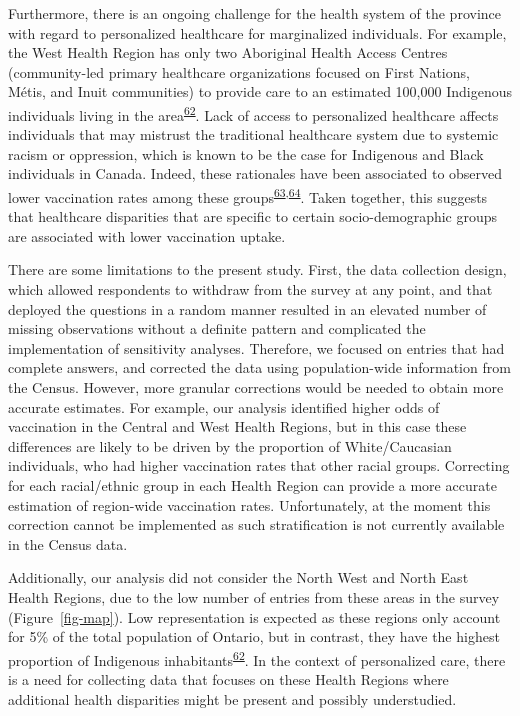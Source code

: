 \documentclass[
  letterpaper,
  DIV=11,
  numbers=noendperiod]{scrartcl}
\begin{document}
Furthermore, there is an ongoing challenge for the health system of the
province with regard to personalized healthcare for marginalized
individuals. For example, the West Health Region has only two Aboriginal
Health Access Centres (community-led primary healthcare organizations
focused on First Nations, Métis, and Inuit communities) to provide care
to an estimated 100,000 Indigenous individuals living in the
area\textsuperscript{\protect\hyperlink{ref-ontariohealth}{62}}. Lack of
access to personalized healthcare affects individuals that may mistrust
the traditional healthcare system due to systemic racism or oppression,
which is known to be the case for Indigenous and Black individuals in
Canada. Indeed, these rationales have been associated to observed lower
vaccination rates among these
groups\textsuperscript{\protect\hyperlink{ref-smylie2022}{63},\protect\hyperlink{ref-eissa2021}{64}}.
Taken together, this suggests that healthcare disparities that are
specific to certain socio-demographic groups are associated with lower
vaccination uptake.

There are some limitations to the present study. First, the data
collection design, which allowed respondents to withdraw from the survey
at any point, and that deployed the questions in a random manner
resulted in an elevated number of missing observations without a
definite pattern and complicated the implementation of sensitivity
analyses. Therefore, we focused on entries that had complete answers,
and corrected the data using population-wide information from the
Census. However, more granular corrections would be needed to obtain
more accurate estimates. For example, our analysis identified higher
odds of vaccination in the Central and West Health Regions, but in this
case these differences are likely to be driven by the proportion of
White/Caucasian individuals, who had higher vaccination rates that other
racial groups. Correcting for each racial/ethnic group in each Health
Region can provide a more accurate estimation of region-wide vaccination
rates. Unfortunately, at the moment this correction cannot be
implemented as such stratification is not currently available in the
Census data.

Additionally, our analysis did not consider the North West and North
East Health Regions, due to the low number of entries from these areas
in the survey (Figure~\ref{fig-map}). Low representation is expected as
these regions only account for 5\% of the total population of Ontario,
but in contrast, they have the highest proportion of Indigenous
inhabitants\textsuperscript{\protect\hyperlink{ref-ontariohealth}{62}}.
In the context of personalized care, there is a need for collecting data
that focuses on these Health Regions where additional health disparities
might be present and possibly understudied.
\end{document}
